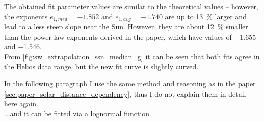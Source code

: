 The obtained fit parameter values are similar to the theoretical values -- however, the exponents $e_{1, med} = -1.852$ and $e_{1, avg} = -1.740$ are up to \SI{13}{\%} larger and lead to a less steep slope near the Sun. However, they are about \SI{12}{\%} smaller than the power-law exponents derived in the paper, which have values of \num{-1.655} and \num{-1.546}.\\

From \autoref{fig:sw_extrapolation_ssn_median_g} it can be seen that both fits agree in the Helios data range, but the new fit curve is slightly curved.\\ 
\begin{figure}[htb]
\end{figure}


In the following paragraph I use the same method and reasoning as in the paper \autoref{sec:paper_solar_distance_dependency}, thus I do not explain them in detail here again.\\

...and it can be fitted via a lognormal function\\

% 
% 
% 


